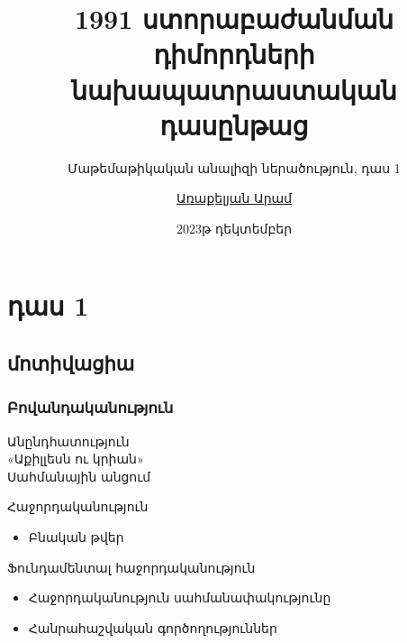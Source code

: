 \documentclass[aspectratio=169]{beamer} %
\title[մաթ․ անալիզ - դաս 1]{1991 ստորաբաժանման դիմորդների նախապատրաստական դասընթաց}
\subtitle{Մաթեմաթիկական անալիզի ներածություն, դաս 1}
\author[Առաքելյան Ա․]{
    \href{mailto:aram.arakeljan@gmail.com}{Առաքելյան Արամ}
}
\institute{\href{https://1991.mil.am/}{«1991» ակադեմիա}}
\date{2023թ դեկտեմբեր}
\begin{document}
    \begin{frame}
        \titlepage
    \end{frame}
     \section{դաս 1}
    \subsection{մոտիվացիա}
    \begin{frame}
    \frametitle{Բովանդականություն}
    \begin{block}{}
        Անընդհատություն\\
        «Աքիլլեսն ու կրիան»\\
        Սահմանային անցում\\
    \end{block}
    \begin{block}{}
        Հաջորդականություն\\
        \begin{itemize}
            \item Բնական թվեր
        \end{itemize}
    \end{block}
    \begin{block}{}
        Ֆունդամենտալ հաջորդականություն\\
        \begin{itemize}
            \item Հաջորդականություն սահմանափակությունը
            \item Հանրահաշվական գործողություններ
        \end{itemize}
    \end{block}
    
    
    \end{frame}
\end{document}
